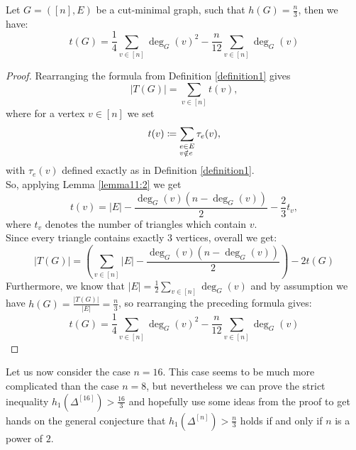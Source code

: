 \begin{lem}\label{lemma363}
Let \(G=([n],E)\) be a cut-minimal graph, such that \(h(G)=\frac{n}{3}\), then we have:
\[
t(G)=\frac{1}{4}\sum\limits_{v\in [n]}\deg_G(v)^2-\frac{n}{12}\sum\limits_{v\in [n]}\deg_G(v)
\]
\begin{proof}
Rearranging the formula from Definition \ref{definition1} gives
\[
|T(G)|=\sum\limits_{v\in [n]}t(v),
\]
where for a vertex \(v\in [n]\) we set
\[
t(v)\coloneqq\sum\limits_{\begin{subarray}{l}e\in E \\ v\notin e\end{subarray}}\tau_e(v),
\]
with \(\tau_e(v)\) defined exactly as in Definition \ref{definition1}.\\
So, applying Lemma \ref{lemma11:2} we get
\[
t(v)=|E|-\frac{\deg_G(v)(n-\deg_G(v))}{2}-\frac{2}{3}t_v,
\]
where \(t_v\) denotes the number of triangles which contain \(v\).\\
Since every triangle contains exactly \(3\) vertices, overall we get:
\[
|T(G)|=\left(\sum\limits_{v\in [n]}|E|-\frac{\deg_G(v)(n-\deg_G(v))}{2}\right)-2t(G)
\]
Furthermore, we know that \(|E|=\frac{1}{2}\sum\limits_{v\in [n]}\deg_G(v)\) and by assumption we have \(h(G)=\frac{|T(G)|}{|E|}=\frac{n}{3}\), so rearranging the preceding formula gives:
\[
t(G)=\frac{1}{4}\sum\limits_{v\in [n]}\deg_G(v)^2-\frac{n}{12}\sum\limits_{v\in [n]}\deg_G(v)
\]
\end{proof}
\end{lem}

Let us now consider the case \(n=16\). This case seems to be much more complicated than the case \(n=8\), but nevertheless we can prove the strict inequality \(h_1(\Delta^{[16]})>\frac{16}{3}\) and hopefully use some ideas from the proof to get hands on the general conjecture that \(h_1(\Delta^{[n]})>\frac{n}{3}\) holds if and only if \(n\) is a power of \(2\).

